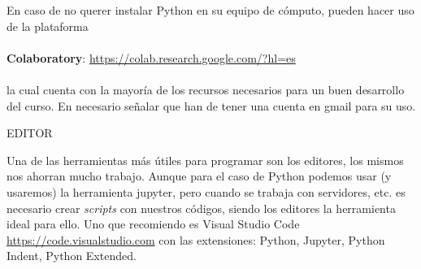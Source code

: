 \documentclass[12pt]{amsart} %
\begin{document}
\vspace{14pt}

En caso de no querer instalar Python en su equipo de cómputo, pueden hacer uso de la plataforma 
\\~\\
\textbf{Colaboratory}: \url{https://colab.research.google.com/?hl=es}
\\~\\
la cual cuenta con la mayoría de los recursos necesarios para un buen desarrollo del curso. En necesario señalar que han de tener una cuenta en gmail para su uso.


\vspace{14pt}

\parbox[c]{235pt}{EDITOR}
\vspace{8pt}

Una de las herramientas más útiles para programar son los editores, los mismos nos ahorran mucho trabajo. Aunque para el caso de Python podemos usar (y usaremos) la herramienta jupyter, pero cuando se trabaja con servidores, etc. es necesario crear \textit{scripts} con nuestros códigos, siendo los editores la herramienta ideal para ello.  Uno que recomiendo es Visual Studio Code \url{https://code.visualstudio.com} con las extensiones: Python, Jupyter, Python Indent, Python Extended.

\end{document}
